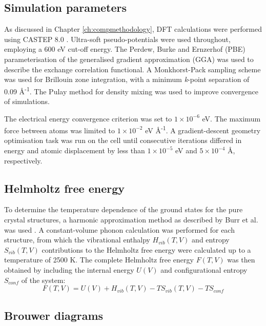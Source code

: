 \subsection{Simulation parameters}

As discussed in Chapter \ref{ch:compmethodology}, DFT calculations were performed using CASTEP 8.0 \cite{Clark2005}. Ultra-soft pseudo-potentials were used throughout, employing a 600 eV cut-off energy. The Perdew, Burke and Ernzerhof (PBE) \cite{Perdew1996} parameterisation of the generalised gradient approximation (GGA) was used to describe the exchange correlation functional. A Monkhorst-Pack sampling scheme \cite{Monkhorst1976} was used for Brillouin zone integration, with a minimum \emph{k}-point separation of 0.09 \r{A}\textsuperscript{-1}. The Pulay method for density mixing \cite{Pulay1980} was used to improve convergence of simulations. 

The electrical energy convergence criterion was set to $1\times10^{-6} $ eV. The maximum force between atoms was limited to $1\times10^{-2}$ eV \r{A}\textsuperscript{-1}. A gradient-descent geometry optimisation task was run on the cell until consecutive iterations differed in energy and atomic displacement by less than $1\times10^{-5}$ eV and $5\times10^{-4}$ \r{A}, respectively. 


\subsection{Helmholtz free energy}

To determine the temperature dependence of the ground states for the pure crystal structures, a harmonic approximation method as described by Burr et al. was used \cite{burr2015crystal,jackson2016resolving}. A constant-volume phonon calculation was performed for each structure, from which the vibrational enthalpy $H_{vib}(T, V)$ and entropy $S_{vib}(T, V)$ contributions to the Helmholtz free energy were calculated up to a temperature of 2500 K. The complete Helmholtz free energy $F(T, V)$ was then obtained by including the internal energy $U(V)$ and configurational entropy $S_{conf}$ of the system:
\begin{equation} \label{helmholtz_equation}
F(T, V) = U(V) + H_{vib}(T, V) - TS_{vib}(T, V) - TS_{conf}
\end{equation}

\subsection{Brouwer diagrams}

